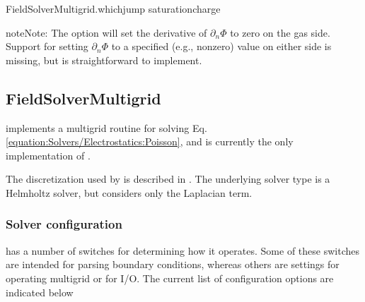 \documentclass[letterpaper,10pt,english]{sphinxmanual}
\begin{document}
\begin{sphinxVerbatim}[commandchars=\\\{\},formatcom=\scriptsize]
FieldSolverMultigrid.which\PYGZus{}jump  saturation\PYGZus{}charge
\end{sphinxVerbatim}

\begin{sphinxadmonition}{note}{Note:}
The  option will set the derivative of \(\partial_n\Phi\) to zero on the gas side.
Support for setting \(\partial_n\Phi\) to a specified (e.g., non\sphinxhyphen{}zero) value on either side is missing, but is straightforward to implement.
\end{sphinxadmonition}


\subsection{FieldSolverMultigrid}
\label{\detokenize{Solvers/Electrostatics:fieldsolvermultigrid}}\label{\detokenize{Solvers/Electrostatics:chap-fieldsolvermultigrid}}\label{\detokenize{Solvers/Electrostatics:chap-electrostaticdispersion}}
 implements a multigrid routine for solving Eq. \ref{equation:Solvers/Electrostatics:Poisson}, and is currently the only implementation of .

The discretization used by  is described in {\hyperref[\detokenize{Source/LinearSolvers:chap-linearsolvers}]{}}.
The underlying solver type is a Helmholtz solver, but  considers only the Laplacian term.


\subsubsection{Solver configuration}
\label{\detokenize{Solvers/Electrostatics:solver-configuration}}
 has a number of switches for determining how it operates.
Some of these switches are intended for parsing boundary conditions, whereas others are settings for operating multigrid or for I/O.
The current list of configuration options are indicated below
\end{document}
